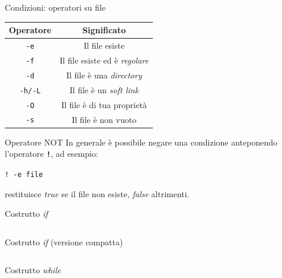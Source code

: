 \documentclass{beamer}
\begin{document}
    \begin{frame}{Condizioni: operatori su file}
        \begin{center}
            \begin{tabular}{ |c|c| } 
                \hline
                \textbf{Operatore} & \textbf{Significato} \\
                \hline
                \texttt{-e} & Il file esiste \\
                \hline
                \texttt{-f} & Il file esiste ed è \textit{regolare} \\
                \hline
                \texttt{-d} & Il file è una \textit{directory} \\
                \hline
                \texttt{-h/-L} & Il file è un \textit{soft link} \\
                \hline
                \texttt{-O} & Il file è di tua proprietà \\
                \hline
                \texttt{-s} & Il file è non vuoto \\
                \hline
            \end{tabular}
        \end{center}

        \begin{alertblock}{Operatore NOT}
            In generale è possibile negare una condizione anteponendo l'operatore \texttt{\textbf{!}}, ad esempio:

            \begin{center}
                \texttt{! -e file}
            \end{center}

            restituisce \textit{true} se il file non esiste, \textit{false} altrimenti.
        \end{alertblock}
    \end{frame}

    \begin{frame}[fragile]{Costrutto \textit{if}}
        \inputminted[fontsize=\small]{bash}{script/if-example.sh}
    \end{frame}

    \begin{frame}[fragile]{Costrutto \textit{if} (versione compatta)}
        \inputminted[fontsize=\small]{bash}{script/if-example-short.sh}
    \end{frame}

    \begin{frame}{Costrutto \textit{while}}
        \inputminted[fontsize=\small]{bash}{script/while-example.sh}
    \end{frame}
\end{document}
